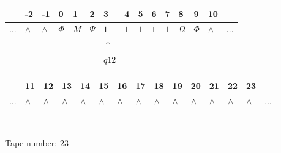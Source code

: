 \documentclass[11pt]{article}
\begin{document}
\begin{table}[H]
\centering
\begin{tabular}{lllllllllllllll}
 & -2 & -1 & 0 & 1 & 2 & 3 & 4 & 5 & 6 & 7 & 8 & 9 & 10 & \\
\hline
$...$ & \multicolumn{1}{|l|}{$\wedge$} & \multicolumn{1}{|l|}{$\wedge$} & \multicolumn{1}{|l|}{$\Phi$} & \multicolumn{1}{|l|}{$M$} & \multicolumn{1}{|l|}{$\Psi$} & \multicolumn{1}{|l|}{$1$} & \multicolumn{1}{|l|}{$1$} & \multicolumn{1}{|l|}{$1$} & \multicolumn{1}{|l|}{$1$} & \multicolumn{1}{|l|}{$1$} & \multicolumn{1}{|l|}{$\Omega$} & \multicolumn{1}{|l|}{$\Phi$} & \multicolumn{1}{|l|}{$\wedge$} & $...$\\
\hline
&  &  &  &  &  & $\uparrow$ &  &  &  &  &  &  &  &  \\
&  &  &  &  &  & $ q12 $ &  &  &  &  &  &  &  &  \\
\end{tabular}
\begin{tabular}{lllllllllllllll}
 & 11 & 12 & 13 & 14 & 15 & 16 & 17 & 18 & 19 & 20 & 21 & 22 & 23 & \\
\hline
$...$ & \multicolumn{1}{|l|}{$\wedge$} & \multicolumn{1}{|l|}{$\wedge$} & \multicolumn{1}{|l|}{$\wedge$} & \multicolumn{1}{|l|}{$\wedge$} & \multicolumn{1}{|l|}{$\wedge$} & \multicolumn{1}{|l|}{$\wedge$} & \multicolumn{1}{|l|}{$\wedge$} & \multicolumn{1}{|l|}{$\wedge$} & \multicolumn{1}{|l|}{$\wedge$} & \multicolumn{1}{|l|}{$\wedge$} & \multicolumn{1}{|l|}{$\wedge$} & \multicolumn{1}{|l|}{$\wedge$} & \multicolumn{1}{|l|}{$\wedge$} & $...$\\
\hline
&  &  &  &  &  &  &  &  &  &  &  &  &  &  \\
&  &  &  &  &  &  &  &  &  &  &  &  &  &  \\
\end{tabular}
\\
Tape number: 23
\noindent\makebox[\linewidth]{\hdashrule{\textwidth}{1pt}{1pt}}\end{table}
\clearpage
\end{document}
